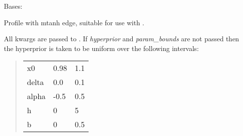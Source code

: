 \documentclass[letterpaper,10pt,english]{sphinxmanual}
\begin{document}

\begin{fulllineitems}
\label{gptools:gptools.mean.MtanhMeanFunction1d}
Bases: {\hyperref[gptools:gptools.mean.MeanFunction]{}}

Profile with mtanh edge, suitable for use with .

All kwargs are passed to {\hyperref[gptools:gptools.mean.MeanFunction]{}}. If \emph{hyperprior} and
\emph{param\_bounds} are not passed then the hyperprior is taken to be uniform
over the following intervals:
\begin{quote}

\begin{tabulary}{\linewidth}{|L|L|L|}
\hline

x0
 & 
0.98
 & 
1.1
\\

delta
 & 
0.0
 & 
0.1
\\

alpha
 & 
-0.5
 & 
0.5
\\

h
 & 
0
 & 
5
\\

b
 & 
0
 & 
0.5
\\
\hline\end{tabulary}

\end{quote}

\end{fulllineitems}

\end{document}
